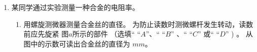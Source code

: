 \begin{enumerate}
\begin{enumerate}
\end{enumerate}




\item
{}
某同学通过实验测量一种合金的电阻率。
\begin{figure}[h!]
\centering
\begin{subfigure}{0.4\linewidth}
\centering
 
\caption{}\label{}
\end{subfigure}
\begin{subfigure}{0.55\linewidth}
\centering
% 
  
\caption{}\label{}
\end{subfigure}
\end{figure}

\begin{enumerate}
\item
用螺旋测微器测量合金丝的直径。 为防止读数时测微螺杆发生转动，读数前应先旋紧
图$ a $所示的部件 \underlinegap 
（选填“ “$ A $”、“ “$ B $” 、“ “$ C $” 或“ “$ D $” ) 。 从图中的示数可读出合金丝的直径为 \underlinegap 
$ mm $。



\end{enumerate}
\end{enumerate}
